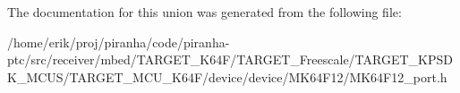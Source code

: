 The documentation for this union was generated from the following file\+:\begin{DoxyCompactItemize}
\item 
/home/erik/proj/piranha/code/piranha-\/ptc/src/receiver/mbed/\+T\+A\+R\+G\+E\+T\+\_\+\+K64\+F/\+T\+A\+R\+G\+E\+T\+\_\+\+Freescale/\+T\+A\+R\+G\+E\+T\+\_\+\+K\+P\+S\+D\+K\+\_\+\+M\+C\+U\+S/\+T\+A\+R\+G\+E\+T\+\_\+\+M\+C\+U\+\_\+\+K64\+F/device/device/\+M\+K64\+F12/M\+K64\+F12\+\_\+port.\+h\end{DoxyCompactItemize}
